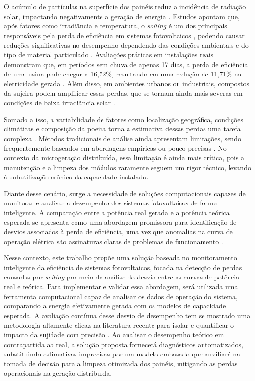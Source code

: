 \documentclass{UNESC}
\begin{document}
O acúmulo de partículas na superfície dos painéis reduz a incidência de radiação solar, impactando negativamente a geração de energia \cite{Araujo_Marques}. Estudos apontam que, após fatores como irradiância e temperatura, o \textit{soiling} é um dos principais responsáveis pela perda de eficiência em sistemas fotovoltaicos \cite{Tramontin_Rampinelli_2024}, podendo causar reduções significativas no desempenho dependendo das condições ambientais e do tipo de material particulado \cite{john2016, jaszczur2020}. Avaliações práticas em instalações reais demonstram que, em períodos sem chuva de apenas 17 dias, a perda de eficiência de uma usina pode chegar a 16,52\%, resultando em uma redução de 11,71\% na eletricidade gerada \cite{Araujo_Marques}. Além disso, em ambientes urbanos ou industriais, compostos da sujeira podem amplificar essas perdas, que se tornam ainda mais severas em condições de baixa irradiância solar \cite{Tramontin_Rampinelli_2024}.

Somado a isso, a variabilidade de fatores como localização geográfica, condições climáticas e composição da poeira torna a estimativa dessas perdas uma tarefa complexa \cite{Araujo_Marques}. Métodos tradicionais de análise ainda apresentam limitações, sendo frequentemente baseados em abordagens empíricas ou pouco precisas \cite{abuzaid2022}. No contexto da microgeração distribuída, essa limitação é ainda mais crítica, pois a manutenção e a limpeza dos módulos raramente seguem um rigor técnico, levando à subutilização crônica da capacidade instalada.

Diante desse cenário, surge a necessidade de soluções computacionais capazes de monitorar e analisar o desempenho dos sistemas fotovoltaicos de forma inteligente. A comparação entre a potência real gerada e a potência teórica esperada se apresenta como uma abordagem promissora para identificação de desvios associados à perda de eficiência, uma vez que anomalias na curva de operação elétrica são assinaturas claras de problemas de funcionamento \cite{Araujo_Marques}.

Nesse contexto, este trabalho propõe uma solução baseada no monitoramento inteligente da eficiência de sistemas fotovoltaicos, focada na detecção de perdas causadas por \textit{soiling} por meio da análise do desvio entre as curvas de potência real e teórica. Para implementar e validar essa abordagem, será utilizada uma ferramenta computacional capaz de analisar os dados de operação do sistema, comparando a energia efetivamente gerada com os modelos de capacidade esperada. A avaliação contínua desse desvio de desempenho tem se mostrado uma metodologia altamente eficaz na literatura recente para isolar e quantificar o impacto da sujidade com precisão \cite{Tramontin_Rampinelli_2024}. Ao analisar o desempenho teórico em contrapartida ao real, a solução proposta fornecerá diagnósticos automatizados, substituindo estimativas imprecisas por um modelo embasado que auxiliará na tomada de decisão para a limpeza otimizada dos painéis, mitigando as perdas operacionais na geração distribuída.
\end{document}
